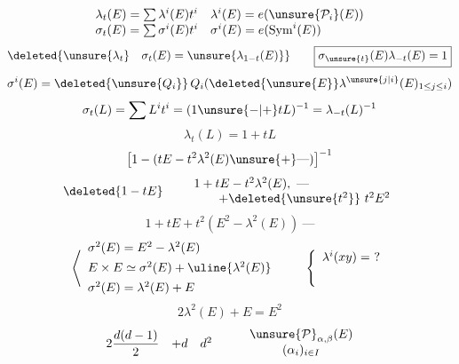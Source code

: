 \[
\begin{array}{ll}
\lambda_t(E)=\sum\lambda^i(E)t^i&\lambda^i(E)=e(\unsure{\mathcal P_i}(E))\\
\sigma_t(E)=\sum\sigma^i(E)t^i&\sigma^i(E)=e(\operatorname{Sym}^i(E))
\end{array}
\]
\[
\deleted{\unsure{\lambda_t}\quad\sigma_t(E)=\unsure{\lambda_{1-t}(E)}}\qquad
\boxed{\sigma_{\unsure{t}}(E)\lambda_{-t}(E)=1}
\]
\[
\sigma^i(E)=\deleted{\unsure{Q_i}}\,Q_i(\deleted{\unsure{E}}\lambda^{\unsure{j|i}}(E)_{1\leq j\leq i})
\]
\[
\sigma_t(L)=\sum L^it^i=(1\unsure{-|+}tL)^{-1}=\lambda_{-t}(L)^{-1}
\]
\[
\lambda_t(L)=1+tL
\]
\margin{$\sigma$}
\[
\left[1-(tE-t^2\lambda^2(E)\unsure{+}\text{---})\right]^{-1}
\]
\[
\deleted{1-tE}\qquad
\begin{array}{l}
1+tE-t^2\lambda^2(E),\ \text{---}\\
\qquad+\deleted{\unsure{t^2}}\ t^2E^2
\end{array}
\]
\[
1+tE+t^2(E^2-\lambda^2(E))\ \text{---}
\]
\[
\left\langle\begin{array}{l}
\sigma^2(E)=E^2-\lambda^2(E)\\[1ex]
E\times E\simeq\sigma^2(E)+\uline{\lambda^2(E)}\\[1ex]
\sigma^2(E)=\lambda^2(E)+E
\end{array}\right.
\qquad
\left\{\begin{array}{l}\lambda^i(xy)=\ ?\\[4ex]\end{array}\right.
\]
\[
\boxed{2\lambda^2(E)+E=E^2}
\]
\[
\begin{array}{ccc}2\dfrac{d(d-1)}{2}&+d&d^2\end{array}
\qquad
\begin{array}{c}\unsure{\mathcal P}_{\alpha,\beta}(E)\\(\alpha_i)_{i\in I}\end{array}
\]
